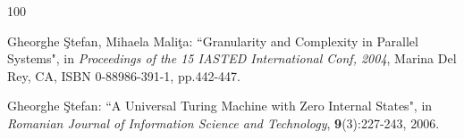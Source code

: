 \begin{thebibliography}{100}


  Gheorghe \c Stefan, Mihaela Mali\c ta: ``Granularity and Complexity in Parallel Systems", in {\em Proceedings of the 15 IASTED International Conf, 2004}, Marina Del Rey, CA, ISBN 0-88986-391-1, pp.442-447.


  Gheorghe \c Stefan: ``A Universal Turing Machine with Zero Internal
States", in {\em Romanian Journal of Information Science and
Technology}, {\bf 9}(3):227-243,  2006.







\end{thebibliography}
